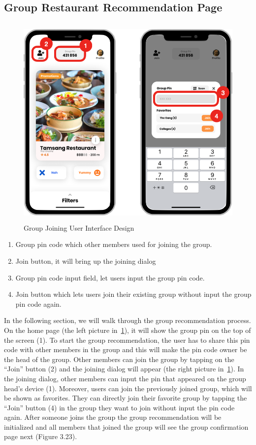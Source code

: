\documentclass[12pt,oneside,openright,a4paper]{cpe-english-project}
\begin{document}
\subsection{Group Restaurant Recommendation Page}
\begin{figure}[!h]\centering
\includegraphics[height=300pt]{./images/3ui_GroupJoiningUserInterfaceDesign.png}
\caption{Group Joining User Interface Design}\label{fig:3ui_GroupJoiningUserInterfaceDesign}
\end{figure}
\begin{enumerate}
\item Group pin code which other members used for joining the group.
\item Join button, it will bring up the joining dialog
\item Group pin code input field, let users input the group pin code.
\item Join button which lets users join their existing group without input the group pin code again.
\end{enumerate}
In the following section, we will walk through the group recommendation process. On the home page (the left picture in~\ref{fig:3ui_GroupJoiningUserInterfaceDesign}), it will show the group pin on the top of the screen (1). To start the group recommendation, the user has to share this pin code with other members in the group and this will make the pin code owner be the head of the group. Other members can join the group by tapping on the “Join” button (2) and the joining dialog will appear (the right picture in~\ref{fig:3ui_GroupJoiningUserInterfaceDesign}). In the joining dialog, other members can input the pin that appeared on the group head’s device (1). Moreover, users can join the previously joined group, which will be shown as favorites. They can directly join their favorite group by tapping the “Join” button (4) in the group they want to join without input the pin code again. After someone joins the group the group recommendation will be initialized and all members that joined the group will see the group confirmation page next (Figure 3.23).
\end{document}
